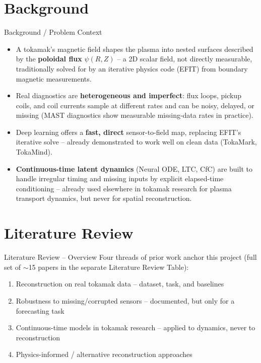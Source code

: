 \documentclass[aspectratio=169]{beamer}
\begin{document}
\section{Background}
\begin{frame}{Background / Problem Context}
  \begin{itemize}
    \item A tokamak's magnetic field shapes the plasma into nested surfaces
      described by the \textbf{poloidal flux} $\psi(R,Z)$ -- a 2D scalar
      field, not directly measurable, traditionally solved for by an
      iterative physics code (EFIT) from boundary magnetic measurements.
    \item Real diagnostics are \textbf{heterogeneous and imperfect}: flux
      loops, pickup coils, and coil currents sample at different rates and
      can be noisy, delayed, or missing (MAST diagnostics show measurable
      missing-data rates in practice).
    \item Deep learning offers a \textbf{fast, direct} sensor-to-field map,
      replacing EFIT's iterative solve -- already demonstrated to work well
      on clean data (TokaMark, TokaMind).
    \item \textbf{Continuous-time latent dynamics} (Neural ODE, LTC, CfC)
      are built to handle irregular timing and missing inputs by explicit
      elapsed-time conditioning -- already used elsewhere in tokamak
      research for plasma transport dynamics, but never for spatial
      reconstruction.
  \end{itemize}
\end{frame}

\section{Literature Review}
\begin{frame}{Literature Review -- Overview}
  Four threads of prior work anchor this project (full set of $\sim$15
  papers in the separate Literature Review Table):
  \begin{enumerate}
    \item[\textbf{A.}] Reconstruction on real tokamak data -- dataset, task, and baselines
    \item[\textbf{B.}] Robustness to missing/corrupted sensors -- documented, but only for a forecasting task
    \item[\textbf{C.}] Continuous-time models in tokamak research -- applied to dynamics, never to reconstruction
    \item[\textbf{D.}] Physics-informed / alternative reconstruction approaches
  \end{enumerate}
\end{frame}
\end{document}
